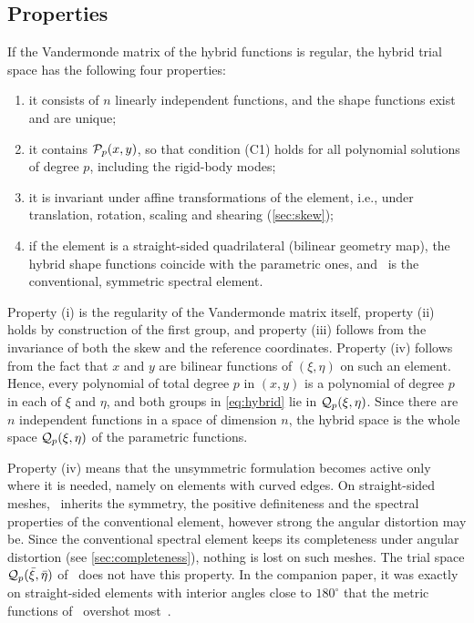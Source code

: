 \subsection{Properties}
\label{sec:hybrid-properties}
%
If the Vandermonde matrix of the hybrid functions is regular, the hybrid trial space has the following four properties:
\begin{enumerate}
  \item[(i)] it consists of $n$ linearly independent functions, and the shape functions exist and are unique;
  \item[(ii)] it contains $\mathcal P_p(x,y)$, so that condition (C1) holds for all polynomial solutions of degree $p$, including the rigid-body modes;
  \item[(iii)] it is invariant under affine transformations of the element, i.e., under translation, rotation, scaling and shearing (\cref{sec:skew});
  \item[(iv)] if the element is a straight-sided quadrilateral (bilinear geometry map), the hybrid shape functions coincide with the parametric ones, and \PH\ is the conventional, symmetric spectral element.
\end{enumerate}
Property (i) is the regularity of the Vandermonde matrix itself, property (ii) holds by construction of the first group, and property (iii) follows from the invariance of both the skew and the reference coordinates. Property (iv) follows from the fact that $x$ and $y$ are bilinear functions of $(\xi,\eta)$ on such an element. Hence, every polynomial of total degree $p$ in $(x,y)$ is a polynomial of degree $p$ in each of $\xi$ and $\eta$, and both groups in \cref{eq:hybrid} lie in $\mathcal Q_p(\xi,\eta)$. Since there are $n$ independent functions in a space of dimension $n$, the hybrid space is the whole space $\mathcal Q_p(\xi,\eta)$ of the parametric functions.

Property (iv) means that the unsymmetric formulation becomes active only where it is needed, namely on elements with curved edges. On straight-sided meshes, \PH\ inherits the symmetry, the positive definiteness and the spectral properties of the conventional element, however strong the angular distortion may be. Since the conventional spectral element keeps its completeness under angular distortion (see \cref{sec:completeness}), nothing is lost on such meshes. The trial space $\mathcal Q_p(\bar\xi,\bar\eta)$ of \PM\ does not have this property. In the companion paper, it was exactly on straight-sided elements with interior angles close to $180^\circ$ that the metric functions of \PM\ overshot most~\cite{Eisentraeger2026axisymmetric}.
%

